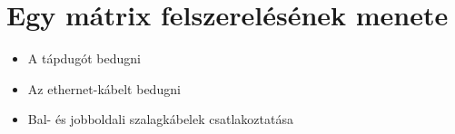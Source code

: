\chapter{Egy mátrix felszerelésének menete}

\begin{itemize}	
	\item A tápdugót bedugni
	\item Az ethernet-kábelt bedugni
	\item Bal- és jobboldali szalagkábelek csatlakoztatása
\end{itemize}